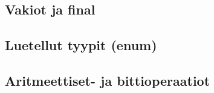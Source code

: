 \documentclass{tufte-book}
\begin{document}
\subsection{Vakiot ja final}
\label{final}

\subsection{Luetellut tyypit (enum)}
\label{enum}

\subsection{Aritmeettiset- ja bittioperaatiot}
\label{operaatiot}


\clearpage
\printglossary[title=Sanasto, toctitle=Sanasto]
\printglossary[type=java, title=Javan avainsanat, toctitle=Javan avainsanat]

\end{document}
